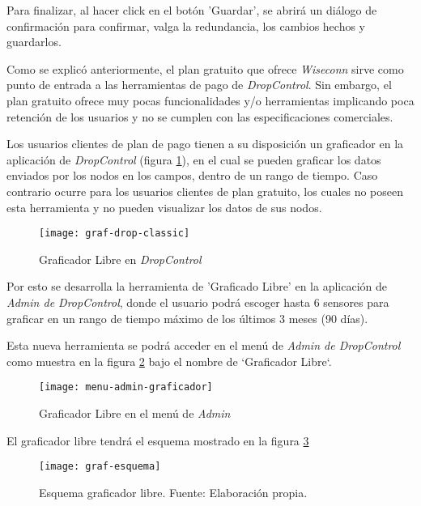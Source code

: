 Para finalizar, al hacer click en el botón 'Guardar', se abrirá un diálogo de confirmación para confirmar, valga la redundancia, los cambios hechos y guardarlos.
\iffalse
{}

Como se explicó anteriormente, el plan gratuito que ofrece \textit{Wiseconn} sirve como punto de entrada a las herramientas
de pago de \textit{DropControl}. Sin embargo, el plan gratuito ofrece muy pocas funcionalidades y/o herramientas
implicando poca retención de los usuarios y no se cumplen con las especificaciones comerciales.

Los usuarios clientes de plan de pago tienen a su disposición un graficador en la aplicación de \textit{DropControl} (figura \ref{fig:graf-drop-classic}), en el cual
se pueden graficar los datos enviados por los nodos en los campos, dentro de un rango de tiempo.
Caso contrario ocurre para los usuarios clientes de plan gratuito, los cuales no poseen esta herramienta y
no pueden visualizar los datos de sus nodos.

\begin{figure}[H]
	\centering
	\texttt{[image: graf-drop-classic]}
	\caption{\label{fig:graf-drop-classic} Graficador Libre en \textit{DropControl}}
\end{figure}

Por esto se desarrolla la herramienta de 'Graficado Libre' en la aplicación de \textit{Admin de DropControl},
donde el usuario podrá escoger hasta 6 sensores para graficar en un rango de tiempo máximo de los últimos 3 meses (90 días).

Esta nueva herramienta se podrá acceder en el menú de \textit{Admin de DropControl} como muestra en la figura \ref{fig:menu-admin-graf1} bajo el nombre de `Graficador Libre`. 

\begin{figure}[H]
	\centering
	\texttt{[image: menu-admin-graficador]}
	\caption{\label{fig:menu-admin-graf1} Graficador Libre en el menú de \textit{Admin}}
\end{figure}

El graficador libre tendrá el esquema mostrado en la figura \ref*{fig:graf-esquema}

\begin{figure}[H]
	\centering
	\texttt{[image: graf-esquema]}
	\caption{\label{fig:graf-esquema} Esquema graficador libre. Fuente: Elaboración propia.}
\end{figure}

